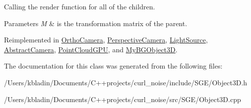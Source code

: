 Calling the render function for all of the children. 


\begin{DoxyParams}{Parameters}
{\em M} & is the transformation matrix of the parent. \\
\hline
\end{DoxyParams}


Reimplemented in \hyperlink{class_ortho_camera_a57f2d0c0ebd9a423c27794d7f9d4d96c}{Ortho\-Camera}, \hyperlink{class_perspective_camera_a3d66d01e63fdfa73c474ae622baf7036}{Perspective\-Camera}, \hyperlink{class_light_source_a32245b583ceb37d47b9c169ddfb77e86}{Light\-Source}, \hyperlink{class_abstract_camera_aaf5b7d99f25d511e75a37c5475912956}{Abstract\-Camera}, \hyperlink{class_point_cloud_g_p_u_af3c43e88c32ba9e323c54904eb361175}{Point\-Cloud\-G\-P\-U}, and \hyperlink{class_my_b_g_object3_d_a2e2960ff0476c72fd754bfe615b32946}{My\-B\-G\-Object3\-D}.



The documentation for this class was generated from the following files\-:\begin{DoxyCompactItemize}
\item 
/\-Users/kbladin/\-Documents/\-C++projects/curl\-\_\-noise/include/\-S\-G\-E/Object3\-D.\-h\item 
/\-Users/kbladin/\-Documents/\-C++projects/curl\-\_\-noise/src/\-S\-G\-E/Object3\-D.\-cpp\end{DoxyCompactItemize}
